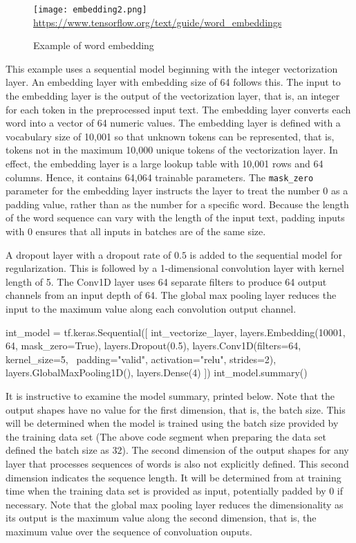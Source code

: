 \begin{figure}
\centering
\texttt{[image: embedding2.png]} \\

\vspace{\baselineskip}
\scriptsize \url{https://www.tensorflow.org/text/guide/word_embeddings}\normalsize
\caption{Example of word embedding}
\label{fig:embedding}
\end{figure}

This example uses a sequential model beginning with the integer vectorization layer. An embedding layer with embedding size of 64 follows this. The input to the embedding layer is the output of the vectorization layer, that is, an integer for each token in the preprocessed input text. The embedding layer converts each word into a vector of 64 numeric values. The embedding layer is defined with a vocabulary size of 10,001 so that unknown tokens can be represented, that is, tokens not in the maximum 10,000 unique tokens of the vectorization layer. In effect, the embedding layer is a large lookup table with 10,001 rows and 64 columns. Hence, it contains 64,064 trainable parameters. The \texttt{mask\_zero} parameter for the embedding layer instructs the layer to treat the number $0$ as a padding value, rather than as the number for a specific word. Because the length of the word sequence can vary with the length of the input text, padding inputs with $0$ ensures that all inputs in batches are of the same size.

A dropout layer with a dropout rate of $0.5$ is added to the sequential model for regularization. This is followed by a 1-dimensional convolution layer with kernel length of 5. The Conv1D layer uses 64 separate filters to produce 64 output channels from an input depth of 64. The global max pooling layer reduces the input to the maximum value along each convolution output channel.

\begin{pythoncode}
int_model = tf.keras.Sequential([
  int_vectorize_layer, 
  layers.Embedding(10001, 64, mask_zero=True),
  layers.Dropout(0.5),
  layers.Conv1D(filters=64, kernel_size=5, \
      padding="valid", activation="relu", strides=2),
  layers.GlobalMaxPooling1D(),
  layers.Dense(4)
  ])
int_model.summary()
\end{pythoncode}

It is instructive to examine the model summary, printed below. Note that the output shapes have no value for the first dimension, that is, the batch size. This will be determined when the model is trained using the batch size provided by the training data set (The above code segment when preparing the data set defined the batch size as $32$). The second dimension of the output shapes for any layer that processes sequences of words is also not explicitly defined. This second dimension indicates the sequence length. It will be determined from at training time when the training data set is provided as input, potentially padded by $0$ if necessary. Note that the global max pooling layer reduces the dimensionality as its output is the maximum value along the second dimension, that is, the maximum value over the sequence of convoluation ouputs. 


